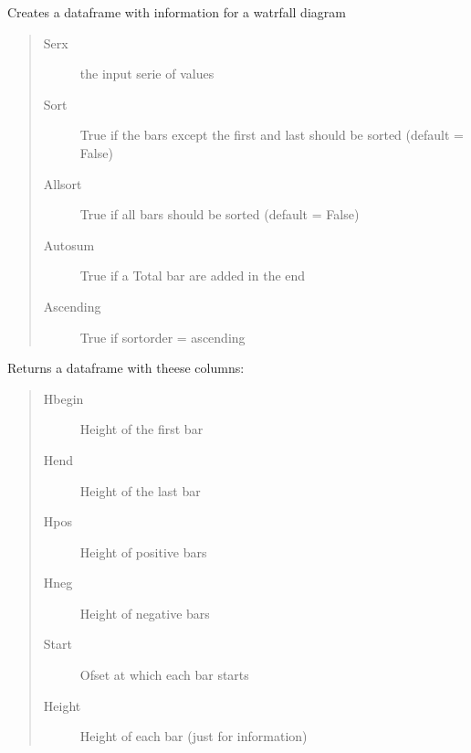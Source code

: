 \documentclass[letterpaper,10pt,english]{sphinxmanual}
\begin{document}

\begin{fulllineitems}
\label{\detokenize{index:modelvis.water}}
\pysigstartsignatures
{}
\pysigstopsignatures
\sphinxAtStartPar
Creates a dataframe with information for a watrfall diagram
\begin{quote}\begin{description}
\item[{Serx}] \leavevmode
\sphinxAtStartPar
the input serie of values

\item[{Sort}] \leavevmode
\sphinxAtStartPar
True if the bars except the first and last should be sorted (default = False)

\item[{Allsort}] \leavevmode
\sphinxAtStartPar
True if all bars should be sorted (default = False)

\item[{Autosum}] \leavevmode
\sphinxAtStartPar
True if a Total bar are added in the end

\item[{Ascending}] \leavevmode
\sphinxAtStartPar
True if sortorder = ascending

\end{description}\end{quote}

\sphinxAtStartPar
Returns a dataframe with theese columns:
\begin{quote}\begin{description}
\item[{Hbegin}] \leavevmode
\sphinxAtStartPar
Height of the first bar

\item[{Hend}] \leavevmode
\sphinxAtStartPar
Height of the last bar

\item[{Hpos}] \leavevmode
\sphinxAtStartPar
Height of positive bars

\item[{Hneg}] \leavevmode
\sphinxAtStartPar
Height of negative bars

\item[{Start}] \leavevmode
\sphinxAtStartPar
Ofset at which each bar starts

\item[{Height}] \leavevmode
\sphinxAtStartPar
Height of each bar (just for information)

\end{description}\end{quote}

\end{fulllineitems}
\end{document}
